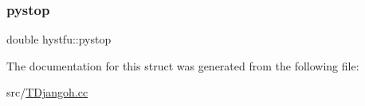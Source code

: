 \mbox{\label{structhystfu_a08d7e516c62ba7c4928e1e6a4544f788}} 
\subsubsection{\texorpdfstring{pystop}{pystop}}
{\footnotesize\ttfamily double hystfu\+::pystop}



The documentation for this struct was generated from the following file\+:\begin{DoxyCompactItemize}
\item 
src/\hyperlink{_t_djangoh_8cc}{T\+Djangoh.\+cc}\end{DoxyCompactItemize}
